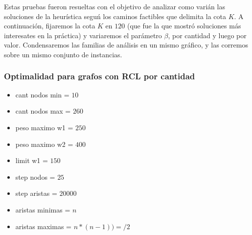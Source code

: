 Estas pruebas fueron resueltas con el objetivo de analizar como vari\'an las soluciones de la heur\'istica segu\'n los caminos factibles que delimita la cota $K$. A continuaci\'on, fijaremos la cota $K$ en $120$ (que fue la que mostr\'o soluciones m\'as interesates en la pr\'actica) y variaremos el par\'ametro $\beta$, por cantidad y luego por valor. Condensaremos las familias de an\'alisis en un mismo gr\'afico, y las corremos sobre un mismo conjunto de instancias.

\subsubsection{Optimalidad para grafos con RCL por cantidad}

\begin{itemize}
	\item cant nodos min = $10$
	\item cant nodos max = $260$
	\item peso maximo w1 = $250$
	\item peso maximo w2 = $400$
	\item limit w1 = $150$
	\item step nodos = $25$
	\item step aristas = $20000$
	\item aristas minimas = $n$
	\item aristas maximas = $n * (n-1))=/2$
\end{itemize}


